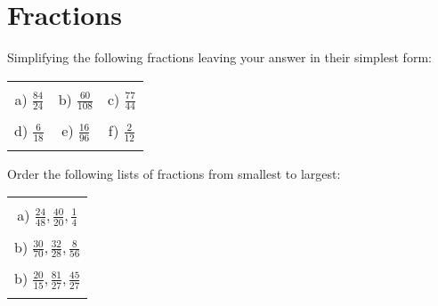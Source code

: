 \documentclass[12pt]{article}
\begin{document}
\section{Fractions}
Simplifying the following fractions leaving your answer in their simplest form:
\begin{table}[h!]
\centering
\begin{tabular}{c c c}
\hspace{2cm} & \hspace{6cm} & \hspace{4cm}\\
a) $\frac{84}{24}$ & b) $\frac{60}{108}$ & c) $\frac{77}{44}$\\ \\
d) $\frac{6}{18}$ & e) $\frac{16}{96}$ & f) $\frac{2}{12}$\\ \\
\end{tabular}
\end{table}
\newline
Order the following lists of fractions from smallest to largest:
\begin{table}[h!]
\centering
\begin{tabular}{c}
\hspace{4cm}\\
a) $\frac{24}{48}, \frac{40}{20}, \frac{1}{4}$\\ \\
b) $\frac{30}{70}, \frac{32}{28}, \frac{8}{56}$\\ \\
b) $\frac{20}{15}, \frac{81}{27}, \frac{45}{27}$\\ \\
\end{tabular}
\end{table}
\newline
\end{document}
